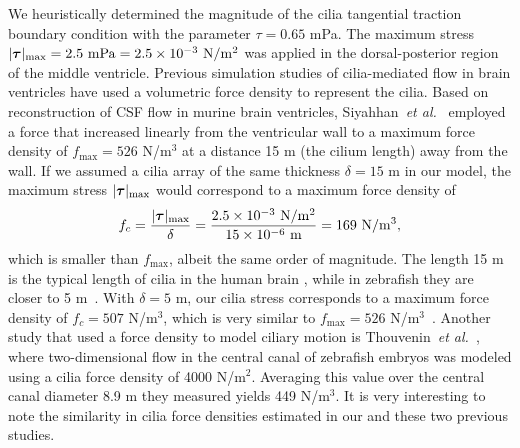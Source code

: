 \documentclass{WileyMSP-template}
\begin{document}
We heuristically determined the magnitude of the cilia tangential traction boundary condition
with the parameter $\tau = 0.65$ mPa. The maximum stress
$\vert\bm{\tau}\vert_{\mathrm{max}} = 2.5 \ \mathrm{mPa} = \num{2.5e-3} \ \mathrm{N/m^2}$
was applied in the dorsal-posterior region of the middle ventricle.
Previous simulation studies of cilia-mediated flow in brain ventricles have
used a volumetric force density to represent the cilia.
Based on reconstruction of CSF flow in murine brain ventricles,
Siyahhan~\emph{et al.}~\cite{Siyahhan2014FlowVentricles}
employed a force that increased linearly from the ventricular wall to a maximum force density of
$f_{\mathrm{max}} = 526$ N/$\mathrm{m^3}$ at a distance 15 \textmu m (the cilium length)
away from the wall. If we assumed a cilia array of the same thickness
$\delta = 15$ \textmu m in our model, the maximum stress $\vert\bm{\tau}\vert_{\mathrm{max}}$
would correspond to a maximum force density of 
\begin{equation*}
    f_c = \frac{\vert\bm{\tau}\vert_{\mathrm{max}}}{\delta}
        = \frac{\num{2.5e-3} \ \mathrm{N/m^2}}{\num{15e-6} \ \mathrm{m}}
        = 169 \ \mathrm{N/m^3},
\end{equation*}
which is smaller than $f_{\mathrm{max}}$, albeit the same order of magnitude.
The length 15 \textmu m is the typical length of cilia in the human brain
\cite{Afzelius2004CiliaRelatedDiseases, Siyahhan2014FlowVentricles},
while in zebrafish they are closer to 5 \textmu m~\cite{Olstad2019CiliaryDevelopment,
Salman2022ComputationalEmbryo, Ringers2023NovelEpithelia}.
With $\delta=5$ \textmu m, our cilia stress corresponds to a maximum force density of
$f_c=507$ N/$\mathrm{m^3}$, which is very similar to
$f_{\mathrm{max}} = 526$ N/$\mathrm{m^3}$~\cite{Siyahhan2014FlowVentricles}.
Another study that used a force density to model ciliary motion is
Thouvenin~\emph{et al.}~\cite{Thouvenin2020OriginCanal}, where two-dimensional flow
in the central canal of zebrafish embryos was modeled using a cilia force density of
4000 N/$\mathrm{m^2}$. Averaging this value over the central canal diameter 8.9 \textmu m
they measured yields 449 N/$\mathrm{m^3}$. It is very interesting to note the similarity 
in cilia force densities estimated in our and these two previous studies. 
\end{document}
